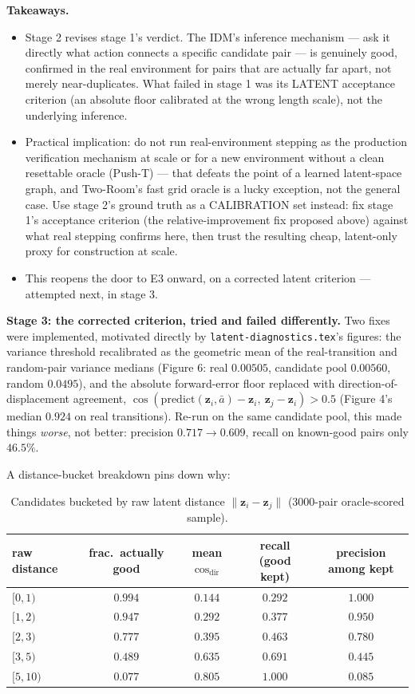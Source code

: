 \documentclass[11pt]{article}
\newcommand{\zv}{\mathbf{z}}
\begin{document}
\textbf{Takeaways.}
\begin{itemize}[leftmargin=1.4em,itemsep=2pt]
\item Stage 2 revises stage 1's verdict. The IDM's inference mechanism --- ask it directly
what action connects a specific candidate pair --- is genuinely good, confirmed in the real
environment for pairs that are actually far apart, not merely near-duplicates. What failed in
stage 1 was its LATENT acceptance criterion (an absolute floor calibrated at the wrong length
scale), not the underlying inference.
\item Practical implication: do not run real-environment stepping as the production
verification mechanism at scale or for a new environment without a clean resettable oracle
(Push-T) --- that defeats the point of a learned latent-space graph, and Two-Room's fast grid
oracle is a lucky exception, not the general case. Use stage 2's ground truth as a
CALIBRATION set instead: fix stage 1's acceptance criterion (the relative-improvement fix
proposed above) against what real stepping confirms here, then trust the resulting cheap,
latent-only proxy for construction at scale.
\item This reopens the door to E3 onward, on a corrected latent criterion --- attempted next,
in stage 3.
\end{itemize}

\textbf{Stage 3: the corrected criterion, tried and failed differently.} Two fixes were
implemented, motivated directly by \texttt{latent-diagnostics.tex}'s figures: the variance
threshold recalibrated as the geometric mean of the real-transition and random-pair variance
medians (Figure 6: real $0.00505$, candidate pool $0.00560$, random $0.0495$), and the
absolute forward-error floor replaced with direction-of-displacement agreement,
$\cos(\mathrm{predict}(\zv_i,\bar a)-\zv_i,\ \zv_j-\zv_i) > 0.5$ (Figure 4's median $0.924$ on
real transitions). Re-run on the same candidate pool, this made things \emph{worse}, not
better: precision $0.717 \to 0.609$, recall on known-good pairs only $46.5\%$.

A distance-bucket breakdown pins down why:

\begin{table}[h]
\centering
\small
\caption{Candidates bucketed by raw latent distance $\|\zv_i-\zv_j\|$ (3000-pair oracle-scored
sample).}
\begin{tabular}{lcccc}
\toprule
raw distance & frac.\ actually good & mean $\cos_{\mathrm{dir}}$ & recall (good kept) &
precision among kept \\
\midrule
$[0,1)$  & $0.994$ & $0.144$ & $0.292$ & $1.000$ \\
$[1,2)$  & $0.947$ & $0.292$ & $0.377$ & $0.950$ \\
$[2,3)$  & $0.777$ & $0.395$ & $0.463$ & $0.780$ \\
$[3,5)$  & $0.489$ & $0.635$ & $0.691$ & $0.445$ \\
$[5,10)$ & $0.077$ & $0.805$ & $1.000$ & $0.085$ \\
\bottomrule
\end{tabular}
\end{table}
\end{document}
